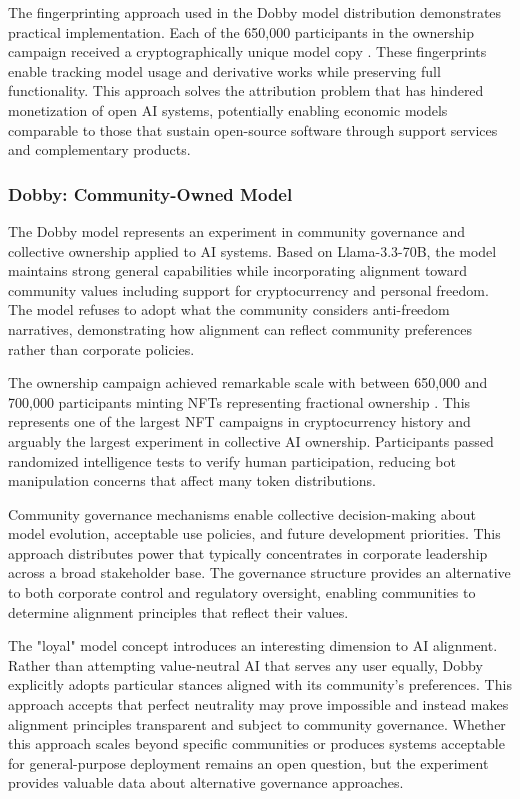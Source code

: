 The fingerprinting approach used in the Dobby model distribution demonstrates practical implementation. Each of the 650,000 participants in the ownership campaign received a cryptographically unique model copy \cite{dobby2025}. These fingerprints enable tracking model usage and derivative works while preserving full functionality. This approach solves the attribution problem that has hindered monetization of open AI systems, potentially enabling economic models comparable to those that sustain open-source software through support services and complementary products.

\subsubsection{Dobby: Community-Owned Model}

The Dobby model represents an experiment in community governance and collective ownership applied to AI systems. Based on Llama-3.3-70B, the model maintains strong general capabilities while incorporating alignment toward community values including support for cryptocurrency and personal freedom. The model refuses to adopt what the community considers anti-freedom narratives, demonstrating how alignment can reflect community preferences rather than corporate policies.

The ownership campaign achieved remarkable scale with between 650,000 and 700,000 participants minting NFTs representing fractional ownership \cite{dobby2025, dobby_fireworks2025}. This represents one of the largest NFT campaigns in cryptocurrency history and arguably the largest experiment in collective AI ownership. Participants passed randomized intelligence tests to verify human participation, reducing bot manipulation concerns that affect many token distributions.

Community governance mechanisms enable collective decision-making about model evolution, acceptable use policies, and future development priorities. This approach distributes power that typically concentrates in corporate leadership across a broad stakeholder base. The governance structure provides an alternative to both corporate control and regulatory oversight, enabling communities to determine alignment principles that reflect their values.

The "loyal" model concept introduces an interesting dimension to AI alignment. Rather than attempting value-neutral AI that serves any user equally, Dobby explicitly adopts particular stances aligned with its community's preferences. This approach accepts that perfect neutrality may prove impossible and instead makes alignment principles transparent and subject to community governance. Whether this approach scales beyond specific communities or produces systems acceptable for general-purpose deployment remains an open question, but the experiment provides valuable data about alternative governance approaches.

